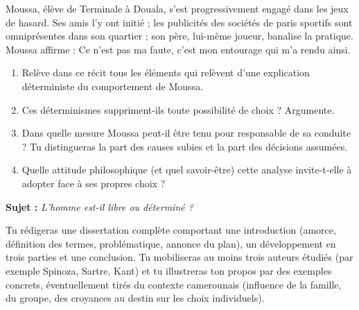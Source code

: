 \documentclass[11pt]{article}
\newcounter{popsec}
\newcounter{popsub}
\newcommand{\courssub}[1]{%
  \stepcounter{popsub}%
  \par\vspace{9pt}\noindent{\popxbold\fontsize{11.5}{13}\selectfont\color{popink}{\color{poporange}\thepopsec.\thepopsub}\hspace{6pt}#1}\par\nopagebreak\vspace{4pt}
}
\begin{document}
\begin{exercice}
Moussa, élève de Terminale à Douala, s'est progressivement engagé dans les jeux de hasard. Ses amis l'y ont initié ; les publicités des sociétés de paris sportifs sont omniprésentes dans son quartier ; son père, lui-même joueur, banalise la pratique. Moussa affirme : \guillemotleft Ce n'est pas ma faute, c'est mon entourage qui m'a rendu ainsi. \guillemotright
\begin{enumerate}
\item Relève dans ce récit tous les éléments qui relèvent d'une explication déterministe du comportement de Moussa.
\item Ces déterminismes suppriment-ils toute possibilité de choix ? Argumente.
\item Dans quelle mesure Moussa peut-il être tenu pour responsable de sa conduite ? Tu distingueras la part des causes subies et la part des décisions assumées.
\item Quelle attitude philosophique (et quel savoir-être) cette analyse invite-t-elle à adopter face à ses propres choix ?
\end{enumerate}
\end{exercice}

\courssub{Je me prépare au Bac}

\begin{exercice}
\textbf{Sujet :} \emph{L'homme est-il libre ou déterminé ?}

Tu rédigeras une dissertation complète comportant une introduction (amorce, définition des termes, problématique, annonce du plan), un développement en trois parties et une conclusion. Tu mobiliseras au moins trois auteurs étudiés (par exemple Spinoza, Sartre, Kant) et tu illustreras ton propos par des exemples concrets, éventuellement tirés du contexte camerounais (influence de la famille, du groupe, des croyances au destin sur les choix individuels).
\end{exercice}
\end{document}
